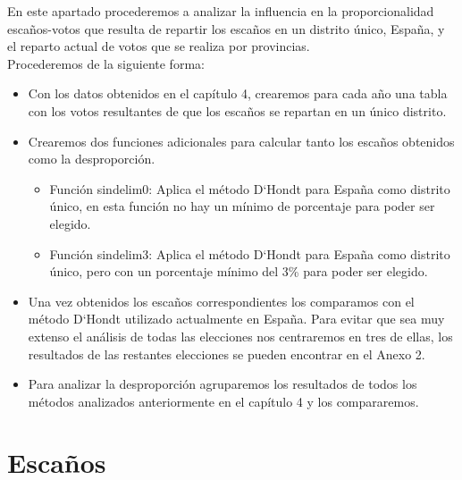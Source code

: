 \documentclass[12pt,a4paper,]{book}
\numberwithin{dummy}{section}
\theoremstyle{ocrenumbox}
\theoremstyle{blacknumex}
\theoremstyle{blacknumbox}
\theoremstyle{ocrenum}
\theoremstyle{ocrenum}
\begin{document}
En este apartado procederemos a analizar la influencia en la
proporcionalidad escaños-votos que resulta de repartir los escaños en un
distrito único, España, y el reparto actual de votos que se realiza por
provincias.\\
Procederemos de la siguiente forma:

\begin{itemize}
\item
  Con los datos obtenidos en el capítulo 4, crearemos para cada año una
  tabla con los votos resultantes de que los escaños se repartan en un
  único distrito.
\item
  Crearemos dos funciones adicionales para calcular tanto los escaños
  obtenidos como la desproporción.

  \begin{itemize}
  \item
    Función sindelim0: Aplica el método D`Hondt para España como
    distrito único, en esta función no hay un mínimo de porcentaje para
    poder ser elegido.
  \item
    Función sindelim3: Aplica el método D`Hondt para España como
    distrito único, pero con un porcentaje mínimo del 3\% para poder ser
    elegido.
  \end{itemize}
\item
  Una vez obtenidos los escaños correspondientes los comparamos con el
  método D`Hondt utilizado actualmente en España. Para evitar que sea
  muy extenso el análisis de todas las elecciones nos centraremos en
  tres de ellas, los resultados de las restantes elecciones se pueden
  encontrar en el Anexo 2.
\item
  Para analizar la desproporción agruparemos los resultados de todos los
  métodos analizados anteriormente en el capítulo 4 y los compararemos.
\end{itemize}

\newpage

\hypertarget{escauxf1os}{%
\section{Escaños}\label{escauxf1os}}
\end{document}
